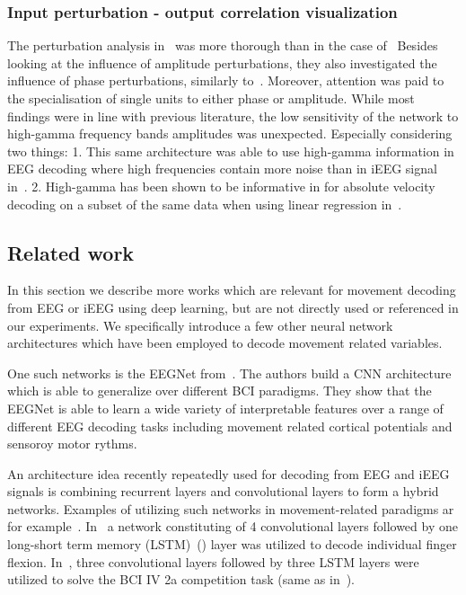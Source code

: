 \subsubsection{Input perturbation - output correlation visualization}
The perturbation analysis in~\cite{Hammer-2021} was more thorough than in the case of~\cite{schirrmeister-deep-2017}
Besides looking at the influence of amplitude perturbations, they also investigated the influence of phase perturbations, similarly to~\cite{hartmann-hierarchical-2018}.
Moreover, attention was paid to the specialisation of single units to either phase or amplitude.
While most findings were in line with previous literature, the low sensitivity of the network to high-gamma frequency bands amplitudes was unexpected.
Especially considering two things: 
1. This same architecture was able to use high-gamma information in EEG decoding where high frequencies contain more noise than in iEEG signal in~\cite{schirrmeister-deep-2017}.
2. High-gamma has been shown to be informative in for absolute velocity decoding on a subset of the same data when using linear regression in~\cite{hammer-predominance-2016}.


\subsection{Related work}
In this section we describe more works which are relevant for movement decoding from EEG or iEEG using deep learning, but are not directly used or referenced in our experiments.
We specifically introduce a few other neural network architectures which have been employed to decode movement related variables.

One such networks is the EEGNet from~\cite{eeg-net}.
The authors build a CNN architecture which is able to generalize over different BCI paradigms.
They show that the EEGNet is able to learn a wide variety of interpretable features over a range of different EEG decoding tasks including movement related cortical potentials and sensoroy motor rythms.

An architecture idea recently repeatedly used for decoding from EEG and iEEG signals is combining recurrent layers and convolutional layers to form a hybrid networks.
Examples of utilizing such networks in movement-related paradigms ar for example~\cite{xie-cnn-lstm-finger-movement, Zhang-2019}.
In~\cite{xie-cnn-lstm-finger-movement} a network constituting of 4 convolutional layers followed by one long-short term memory (LSTM)~(\cite{lstm-paper}) layer was utilized to decode individual finger flexion.
In~\cite{Zhang-2019}, three convolutional layers followed by three LSTM layers were utilized to solve the BCI IV 2a competition task (same as in~\cite{schirrmeister-deep-2017}).


